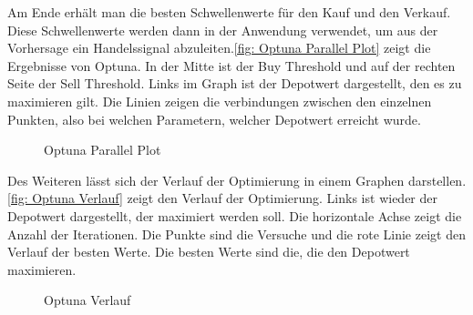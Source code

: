 Am Ende erhält man die besten Schwellenwerte für den Kauf und den Verkauf. Diese Schwellenwerte werden dann in der Anwendung verwendet, um aus der Vorhersage ein Handelssignal abzuleiten.\autoref{fig: Optuna Parallel Plot} zeigt die Ergebnisse von Optuna. In der Mitte ist der Buy Threshold und auf der rechten Seite der Sell Threshold. Links im Graph ist der Depotwert dargestellt, den es zu maximieren gilt. Die Linien zeigen die verbindungen zwischen den einzelnen Punkten, also bei welchen Parametern, welcher Depotwert erreicht wurde.
\begin{figure}[H]
    \centering
    \caption{Optuna Parallel Plot}
    \label{fig: Optuna Parallel Plot}
\end{figure}
Des Weiteren lässt sich der Verlauf der Optimierung in einem Graphen darstellen. \autoref{fig: Optuna Verlauf} zeigt den Verlauf der Optimierung. Links ist wieder der Depotwert dargestellt, der maximiert werden soll. Die horizontale Achse zeigt die Anzahl der Iterationen. Die Punkte sind die Versuche und die rote Linie zeigt den Verlauf der besten Werte. Die besten Werte sind die, die den Depotwert maximieren.
\begin{figure}[H]
    \centering
    \caption{Optuna Verlauf}
    \label{fig: Optuna Verlauf}
\end{figure}

